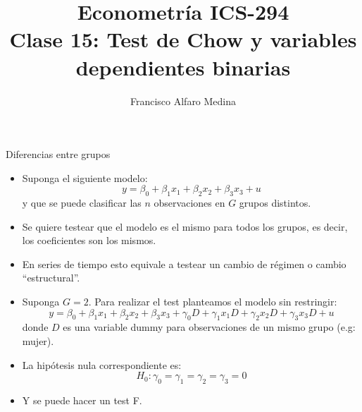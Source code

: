 \documentclass{beamer}
\title[ICS-162]{Econometría ICS-294\\ \small{Clase 15: Test de Chow y variables dependientes binarias }}
\author{Francisco Alfaro Medina}
\institute[USM]
{Universidad Técnica Federico Santa María\\ %
	\medskip
	\textit{} %
	
}
\date{}
\begin{document}
	
\begin{frame}
	\titlepage %


\end{frame}

\begin{frame}[shrink=10]{ Diferencias entre grupos}
\begin{itemize}
    \item Suponga el siguiente modelo:
    \[
    y = \beta_0 + \beta_1 x_1 + \beta_2 x_2 + \beta_3 x_3 + u
    \]
    y que se puede clasificar las \(n\) observaciones en \(G\) grupos distintos.
\end{itemize}

\begin{itemize}
    \item Se quiere testear que el modelo es el mismo para todos los grupos, es decir, los coeficientes son los mismos.
    \item En series de tiempo esto equivale a testear un cambio de régimen o cambio “estructural”.
\end{itemize}

\begin{itemize}
    \item Suponga \(G = 2\). Para realizar el test planteamos el modelo sin restringir:
    \[
    y = \beta_0 + \beta_1 x_1 + \beta_2 x_2 + \beta_3 x_3 + \gamma_0 D + \gamma_1 x_1 D + \gamma_2 x_2 D + \gamma_3 x_3 D + u
    \]
    donde \(D\) es una variable dummy para observaciones de un mismo grupo (e.g: mujer).
\end{itemize}

\begin{itemize}
    \item La hipótesis nula correspondiente es:
    \[
    H_0 : \gamma_0 = \gamma_1 = \gamma_2 = \gamma_3 = 0
    \]
    \item Y se puede hacer un test F.
\end{itemize}
\end{frame}
\end{document}
